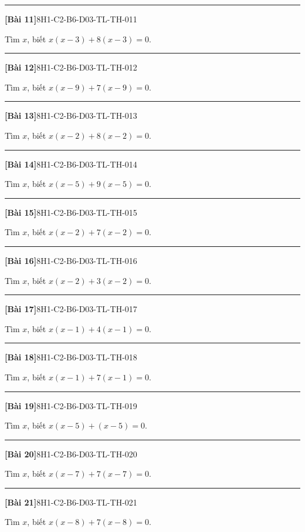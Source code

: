 \documentclass[12pt,a4paper]{article}
\newif\ifloigiai
\newenvironment{cauhoi}[2]{%
  \par\medskip\noindent\rule{\textwidth}{0.4pt}\par\nopagebreak
  \noindent\textbf{[#1]}\hfill{\scriptsize\ttfamily #2}\par\nopagebreak\smallskip}{\par}
\newcommand{\loigiai}[1]{\ifloigiai\par\smallskip\noindent\textit{Lời giải.} #1\par\fi}
\begin{document}
\begin{cauhoi}{Bài 11}{8H1-C2-B6-D03-TL-TH-011}
Tìm $x$, biết $x(x-3)+8(x-3)=0$.
\loigiai{Đặt nhân tử chung: $(x-3)(x+8)=0$. Suy ra $x=3$ hoặc $x=-8$.}
\end{cauhoi}
\begin{cauhoi}{Bài 12}{8H1-C2-B6-D03-TL-TH-012}
Tìm $x$, biết $x(x-9)+7(x-9)=0$.
\loigiai{Đặt nhân tử chung: $(x-9)(x+7)=0$. Suy ra $x=9$ hoặc $x=-7$.}
\end{cauhoi}
\begin{cauhoi}{Bài 13}{8H1-C2-B6-D03-TL-TH-013}
Tìm $x$, biết $x(x-2)+8(x-2)=0$.
\loigiai{Đặt nhân tử chung: $(x-2)(x+8)=0$. Suy ra $x=2$ hoặc $x=-8$.}
\end{cauhoi}
\begin{cauhoi}{Bài 14}{8H1-C2-B6-D03-TL-TH-014}
Tìm $x$, biết $x(x-5)+9(x-5)=0$.
\loigiai{Đặt nhân tử chung: $(x-5)(x+9)=0$. Suy ra $x=5$ hoặc $x=-9$.}
\end{cauhoi}
\begin{cauhoi}{Bài 15}{8H1-C2-B6-D03-TL-TH-015}
Tìm $x$, biết $x(x-2)+7(x-2)=0$.
\loigiai{Đặt nhân tử chung: $(x-2)(x+7)=0$. Suy ra $x=2$ hoặc $x=-7$.}
\end{cauhoi}
\begin{cauhoi}{Bài 16}{8H1-C2-B6-D03-TL-TH-016}
Tìm $x$, biết $x(x-2)+3(x-2)=0$.
\loigiai{Đặt nhân tử chung: $(x-2)(x+3)=0$. Suy ra $x=2$ hoặc $x=-3$.}
\end{cauhoi}
\begin{cauhoi}{Bài 17}{8H1-C2-B6-D03-TL-TH-017}
Tìm $x$, biết $x(x-1)+4(x-1)=0$.
\loigiai{Đặt nhân tử chung: $(x-1)(x+4)=0$. Suy ra $x=1$ hoặc $x=-4$.}
\end{cauhoi}
\begin{cauhoi}{Bài 18}{8H1-C2-B6-D03-TL-TH-018}
Tìm $x$, biết $x(x-1)+7(x-1)=0$.
\loigiai{Đặt nhân tử chung: $(x-1)(x+7)=0$. Suy ra $x=1$ hoặc $x=-7$.}
\end{cauhoi}
\begin{cauhoi}{Bài 19}{8H1-C2-B6-D03-TL-TH-019}
Tìm $x$, biết $x(x-5)+(x-5)=0$.
\loigiai{Đặt nhân tử chung: $(x-5)(x+1)=0$. Suy ra $x=5$ hoặc $x=-1$.}
\end{cauhoi}
\begin{cauhoi}{Bài 20}{8H1-C2-B6-D03-TL-TH-020}
Tìm $x$, biết $x(x-7)+7(x-7)=0$.
\loigiai{Đặt nhân tử chung: $(x-7)(x+7)=0$. Suy ra $x=7$ hoặc $x=-7$.}
\end{cauhoi}
\begin{cauhoi}{Bài 21}{8H1-C2-B6-D03-TL-TH-021}
Tìm $x$, biết $x(x-8)+7(x-8)=0$.
\loigiai{Đặt nhân tử chung: $(x-8)(x+7)=0$. Suy ra $x=8$ hoặc $x=-7$.}
\end{cauhoi}
\end{document}
